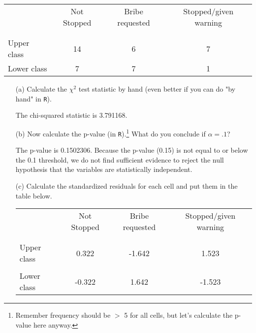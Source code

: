 \documentclass[12pt,letterpaper]{article}
\begin{document}
\newpage
\begin{table}[h!]
	\centering
	\begin{tabular}{l | c c c }
		& Not Stopped & Bribe requested & Stopped/given warning \\
		\\[-1.8ex] 
		\hline \\[-1.8ex]
		Upper class & 14 & 6 & 7 \\
		Lower class & 7 & 7 & 1 \\
		\hline
	\end{tabular}
\end{table}

\begin{enumerate}
	
	\item [(a)]
	Calculate the $\chi^2$ test statistic by hand (even better if you can do "by hand" in \texttt{R}).\\
	\vspace{1cm}
	
 
	\vspace{.5cm}
	\noindent The chi-squared statistic is 3.791168.
	
	\item [(b)]
	Now calculate the p-value (in \texttt{R}).\footnote{Remember frequency should be $>$ 5 for all cells, but let's calculate the p-value here anyway.}  What do you conclude if $\alpha = .1$?\\
	
 
	\vspace{.5cm}
	
\noindent The p-value is 0.1502306. Because the p-value (0.15) is not equal to or below the 0.1 threshold, we do not find sufficient evidence to reject the null hypothesis that the variables are statistically independent.
	
\vspace{2cm}
	\item [(c)] Calculate the standardized residuals for each cell and put them in the table below.
	\vspace{1cm}
	
	 

\begin{table}[h]
	\centering
	\begin{tabular}{l | c c c }
		& Not Stopped & Bribe requested & Stopped/given warning \\
		\\[-1.8ex] 
		\hline \\[-1.8ex]
		Upper class  &0.322  &-1.642  &1.523  \\
		\\
		Lower class &-0.322  &1.642   &-1.523   \\
		

\end{tabular}
\end{table}
\end{enumerate}
\end{document}
